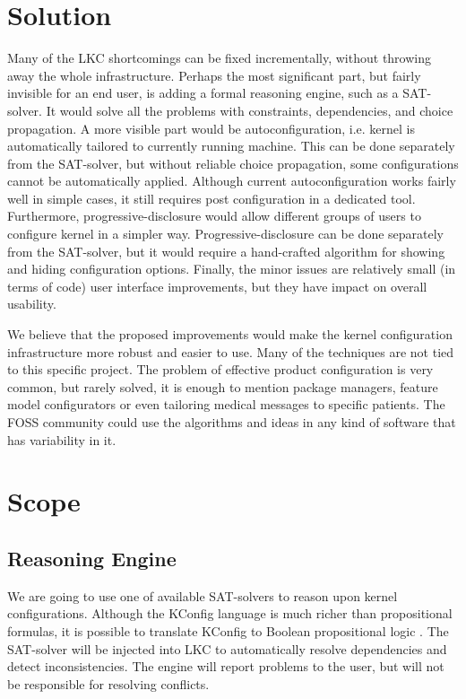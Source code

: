\documentclass{chi2009}
\begin{document}
\section{Solution}
Many of the LKC shortcomings can be fixed incrementally, without throwing away the whole infrastructure. Perhaps the most significant part, but fairly invisible for an end user, is adding a formal reasoning engine, such as a SAT-solver. It would solve all the problems with constraints, dependencies, and choice propagation. A more visible part would be autoconfiguration, i.e. kernel is automatically tailored to currently running machine. This can be done separately from the SAT-solver, but without reliable choice propagation, some configurations cannot be automatically applied. Although current autoconfiguration works fairly well in simple cases, it still requires post configuration in a dedicated tool. Furthermore, progressive-disclosure would allow different groups of users to configure kernel in a simpler way. Progressive-disclosure can be done separately from the SAT-solver, but it would require a hand-crafted algorithm for showing and hiding configuration options. Finally, the minor issues are relatively small (in terms of code) user interface improvements, but they have impact on overall usability.

We believe that the proposed improvements would make the kernel configuration infrastructure more robust and easier to use. Many of the techniques are not tied to this specific project. The problem of effective product configuration is very common, but rarely solved, it is enough to mention package managers, feature model configurators or even tailoring medical messages to specific patients. The FOSS community could use the algorithms and ideas in any kind of software that has variability in it.

\section{Scope}

\subsection{Reasoning Engine}

We are going to use one of available SAT-solvers to reason upon kernel configurations. Although the KConfig language is much richer than propositional formulas, it is possible to translate KConfig to Boolean propositional logic \cite{she:kconfig:2010}. The SAT-solver will be injected into LKC to automatically resolve dependencies and detect inconsistencies. The engine will report problems to the user, but will not be responsible for resolving conflicts.
\end{document}
